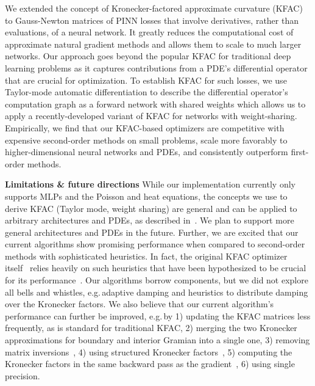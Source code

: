 We extended the concept of Kronecker-factored approximate curvature (KFAC) to Gauss-Newton matrices of PINN losses that involve derivatives, rather than evaluations, of a neural network.
It greatly reduces the computational cost of approximate natural gradient methods and allows them to scale to much larger networks.
Our approach goes beyond the popular KFAC for traditional deep learning problems as it captures contributions from a PDE's differential operator that are crucial for optimization.
To establish KFAC for such losses, we use Taylor-mode automatic differentiation to describe the differential operator's computation graph as a forward network with shared weights which allows us to apply a recently-developed variant of KFAC for networks with weight-sharing.
Empirically, we find that our KFAC-based optimizers are competitive with expensive second-order methods on small problems, scale more favorably to higher-dimensional neural networks and PDEs, and consistently outperform first-order methods.

\textbf{Limitations \& future directions} While our implementation currently only supports MLPs and the Poisson and heat equations, the concepts we use to derive KFAC (Taylor mode, weight sharing) are general and can be applied to arbitrary architectures and PDEs, as described in~.
We plan to support more general architectures and PDEs in the future.
Further, we are excited that our current algorithms show promising performance when compared to second-order methods with sophisticated heuristics.
In fact, the original KFAC optimizer itself~\cite{martens2015optimizing} relies heavily on such heuristics that have been hypothesized to be crucial for its performance~\cite{clarke2023adam}.
Our algorithms borrow components, but we did not explore all bells and whistles, e.g.\,adaptive damping and heuristics to distribute damping over the Kronecker factors.
We also believe that our current algorithm's performance can further be improved, e.g.\,by 1) updating the KFAC matrices less frequently, as is standard for traditional KFAC, 2) merging the two Kronecker approximations for boundary and interior Gramian into a single one, 3) removing matrix inversions~\cite{lin2023simplifying}, 4) using structured Kronecker factors~\cite{lin2023structured}, 5) computing the Kronecker factors in the same backward pass as the gradient~\cite{dangel2020backpack}, 6) using single precision.